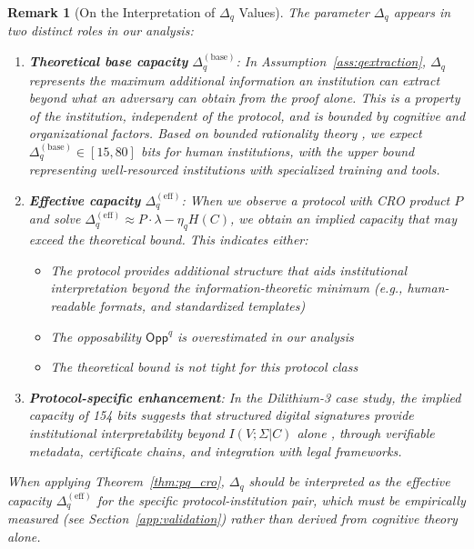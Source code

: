\documentclass{ieeeaccess}
\newcommand{\Opp}{\mathsf{Opp}}
\newtheorem{remark}{Remark}[section]
\begin{document}
\begin{remark}[On the Interpretation of $\Delta_q$ Values]
\label{rem:delta_q_interpretation}
The parameter $\Delta_q$ appears in two distinct roles in our analysis:

\begin{enumerate}
    \item \textbf{Theoretical base capacity} $\Delta_q^{\mathrm{(base)}}$: In Assumption~\ref{ass:qextraction}, $\Delta_q$ represents the maximum additional information an institution can extract beyond what an adversary can obtain from the proof alone. This is a property of the institution, independent of the protocol, and is bounded by cognitive and organizational factors. Based on bounded rationality theory \cite{Miller1956, Simon1957}, we expect $\Delta_q^{\mathrm{(base)}} \in [15, 80]$ bits for human institutions, with the upper bound representing well-resourced institutions with specialized training and tools.

    \item \textbf{Effective capacity} $\Delta_q^{\mathrm{(eff)}}$: When we observe a protocol with CRO product $P$ and solve $\Delta_q^{\mathrm{(eff)}} \approx P \cdot \lambda - \eta_q H(C)$, we obtain an \emph{implied} capacity that may exceed the theoretical bound. This indicates either:
    \begin{itemize}
        \item The protocol provides additional structure that aids institutional interpretation beyond the information-theoretic minimum (e.g., human-readable formats, and standardized templates)
        \item The opposability $\Opp^q$ is overestimated in our analysis
        \item The theoretical bound is not tight for this protocol class
    \end{itemize}

    \item \textbf{Protocol-specific enhancement}: In the Dilithium-3 case study, the implied capacity of 154 bits suggests that structured digital signatures provide institutional interpretability beyond $I(V;\Sigma|C)$ alone ,  through verifiable metadata, certificate chains, and integration with legal frameworks.
\end{enumerate}

When applying Theorem~\ref{thm:pq_cro}, $\Delta_q$ should be interpreted as the \emph{effective} capacity $\Delta_q^{\mathrm{(eff)}}$ for the specific protocol-institution pair, which must be empirically measured (see Section~\ref{app:validation}) rather than derived from cognitive theory alone.
\end{remark}
\end{document}
